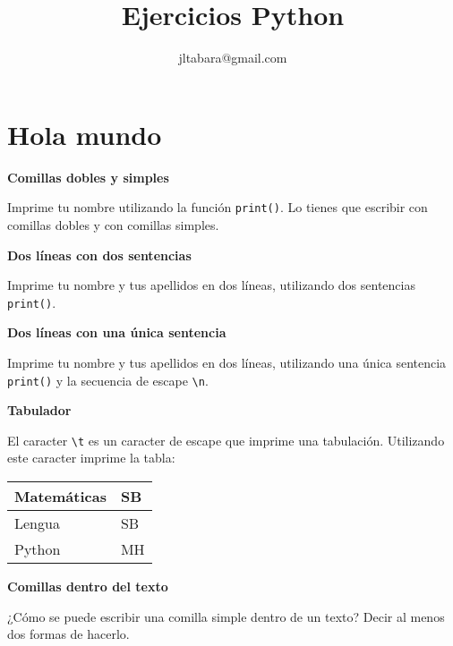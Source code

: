 \documentclass[a4paper, 11pt]{scrartcl}
\author{jltabara@gmail.com}
\title{Ejercicios Python}
\date{}
\begin{document}
\tableofcontents

\thispagestyle{empty}

\newpage



\section{Hola mundo}
\setcounter{page}{1}





\noindent\textbf{\sffamily Comillas dobles y simples}

Imprime tu nombre utilizando la función \verb|print()|. Lo tienes que escribir con comillas dobles  y con comillas simples.



\noindent\textbf{\sffamily Dos líneas con dos sentencias}

Imprime tu nombre y tus apellidos en dos líneas, utilizando dos sentencias \verb|print()|.





\noindent\textbf{\sffamily Dos líneas con una única sentencia}

Imprime tu nombre y tus apellidos en dos líneas, utilizando una única sentencia \verb|print()| y la secuencia de escape \verb|\n|.





\noindent\textbf{\sffamily  \dag{}  Tabulador}

El caracter \verb|\t| es un caracter de escape que imprime una tabulación. Utilizando este caracter imprime la tabla:

\begin{center}

\begin{tabular}{|l|l|}
\hline 
Matemáticas & SB \\ 
\hline 
Lengua & SB\\ 
\hline 
Python & MH \\ 
\hline 
\end{tabular} 

\end{center}





\noindent\textbf{\sffamily Comillas dentro del texto}

¿Cómo se puede escribir una comilla simple dentro de un texto? Decir al menos dos formas de hacerlo.
\end{document}
